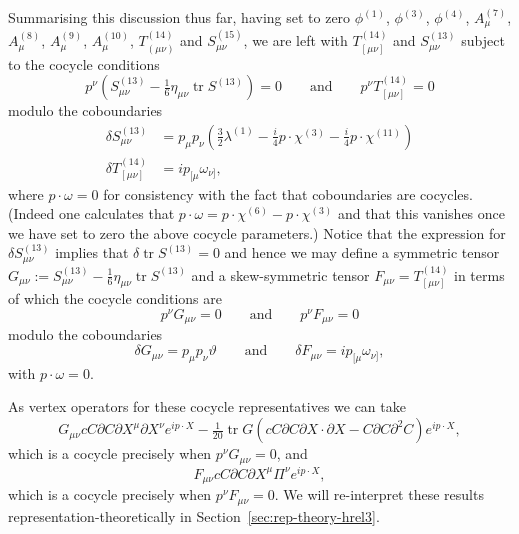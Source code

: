 \documentclass[11pt,reqno,a4paper,final]{amsart}
\theoremstyle{plain}
\theoremstyle{definition}
\renewcommand{\d}{\partial}
\newcommand{\phisup}[1]{\phi^{(#1)}}
\newcommand{\tr}{\operatorname{tr}}
\newcommand{\1}{\mathbb{1}}
\numberwithin{equation}{section}
\begin{document}
\begin{appendices}
Summarising this discussion thus far, having set to zero
$\phisup{1}$, $\phisup{3}$, $\phisup{4}$, $A_\mu^{(7)}$,
$A_\mu^{(8)}$, $A_\mu^{(9)}$, $A_\mu^{(10)}$, $T_{(\mu\nu)}^{(14)}$
and $S_{\mu\nu}^{(15)}$, we are left with $T_{[\mu\nu]}^{(14)}$ and
$S_{\mu\nu}^{(13)}$ subject to the cocycle conditions
\begin{equation}
  p^\nu \left( S_{\mu\nu}^{(13)}- \tfrac16 \eta_{\mu\nu} \tr S^{(13)}
  \right) = 0 \qquad\text{and}\qquad p^\nu T_{[\mu\nu]}^{(14)} = 0
\end{equation}
modulo the coboundaries
\begin{equation}
  \begin{split}
    \delta S_{\mu\nu}^{(13)} &= p_\mu p_\nu \left( \tfrac 32   \lambda^{(1)} - \tfrac i4 p \cdot \chi^{(3)} - \tfrac i4 p \cdot   \chi^{(11)}\right) \\
    \delta T_{[\mu\nu]}^{(14)} &= i p_{[\mu} \omega_{\nu]},
  \end{split}
\end{equation}
where $p \cdot \omega =0$ for consistency with the fact that
coboundaries are cocycles. (Indeed one calculates that $p\cdot \omega =
p \cdot \chi^{(6)}- p \cdot \chi^{(3)}$ and that this vanishes once we
have set to zero the above cocycle parameters.)   Notice that the
expression for $\delta S_{\mu\nu}^{(13)}$ implies that $\delta \tr
S^{(13)} = 0$  and hence we may define a symmetric tensor $G_{\mu\nu}
:= S_{\mu\nu}^{(13)} - \frac 16 \eta_{\mu\nu} \tr S^{(13)}$ and a
skew-symmetric tensor $F_{\mu\nu} = T_{[\mu\nu]}^{(14)}$ in terms of
which the cocycle conditions are
\begin{equation}
  \label{eq:3-relative-cocycles}
  p^\nu G_{\mu\nu} = 0 \qquad\text{and}\qquad p^\nu F_{\mu\nu} = 0
\end{equation}
modulo the coboundaries
\begin{equation}
  \label{eq:3-relative-coboundaries}
  \delta G_{\mu\nu} = p_\mu p_\nu \vartheta   \qquad\text{and}\qquad
  \delta F_{\mu\nu} = i p_{[\mu} \omega_{\nu]},
\end{equation}
with $p \cdot \omega = 0$.

As vertex operators for these cocycle representatives we can take
\begin{equation}
  \label{eq:Zrel3-vertex-operator-1}
  G_{\mu\nu} c C \d C \d X^\mu \d X^\nu e^{i p \cdot X} - \tfrac1{20} \tr
  G \left( c C \d C \d X \cdot \d X - C \d C \d^2 C \right) e^ {i p \cdot X},
\end{equation}
which is a cocycle precisely when $p^\nu G_{\mu\nu} = 0$, and
\begin{equation}
  \label{eq:Zrel3-vertex-operator-2}
  F_{\mu\nu} c C \d C \d X^\mu \Pi^\nu e^{i p \cdot X},
\end{equation}
which is a cocycle precisely when $p^\nu F_{\mu\nu} =0$.  We will
re-interpret these results representation-theoretically in
Section~\ref{sec:rep-theory-hrel3}.


\end{appendices}
\end{document}

